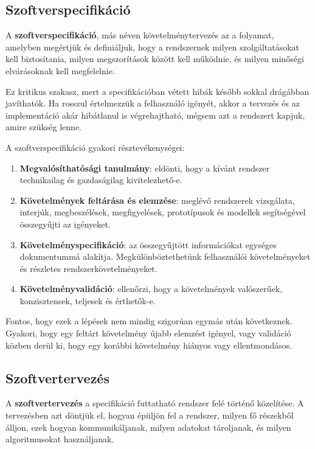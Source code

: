 \subsection{Szoftverspecifikáció}

A \textbf{szoftverspecifikáció}, más néven követelménytervezés az a folyamat, amelyben megértjük és definiáljuk, hogy a rendszernek milyen szolgáltatásokat kell biztosítania, milyen megszorítások között kell működnie, és milyen minőségi elvárásoknak kell megfelelnie.

Ez kritikus szakasz, mert a specifikációban vétett hibák később sokkal drágábban javíthatók. Ha rosszul értelmezzük a felhasználó igényét, akkor a tervezés és az implementáció akár hibátlanul is végrehajtható, mégsem azt a rendszert kapjuk, amire szükség lenne.

A szoftverspecifikáció gyakori résztevékenységei:

\begin{enumerate}
  \item \textbf{Megvalósíthatósági tanulmány}: eldönti, hogy a kívánt rendszer technikailag és gazdaságilag kivitelezhető-e.
  \item \textbf{Követelmények feltárása és elemzése}: meglévő rendszerek vizsgálata, interjúk, megbeszélések, megfigyelések, prototípusok és modellek segítségével összegyűjti az igényeket.
  \item \textbf{Követelményspecifikáció}: az összegyűjtött információkat egységes dokumentummá alakítja. Megkülönböztethetünk felhasználói követelményeket és részletes rendszerkövetelményeket.
  \item \textbf{Követelményvalidáció}: ellenőrzi, hogy a követelmények valószerűek, konzisztensek, teljesek és érthetők-e.
\end{enumerate}

Fontos, hogy ezek a lépések nem mindig szigorúan egymás után következnek. Gyakori, hogy egy feltárt követelmény újabb elemzést igényel, vagy validáció közben derül ki, hogy egy korábbi követelmény hiányos vagy ellentmondásos.

\subsection{Szoftvertervezés}

A \textbf{szoftvertervezés} a specifikáció futtatható rendszer felé történő közelítése. A tervezésben azt döntjük el, hogyan épüljön fel a rendszer, milyen fő részekből álljon, ezek hogyan kommunikáljanak, milyen adatokat tároljanak, és milyen algoritmusokat használjanak.

